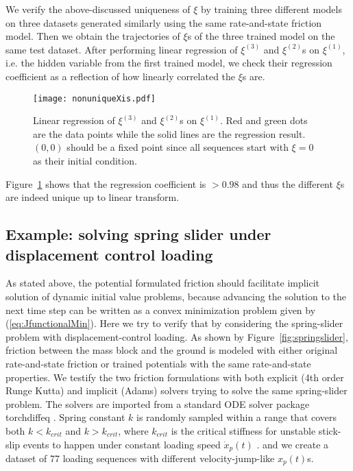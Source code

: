 We verify the above-discussed uniqueness of $\xi$ by training three different models on three datasets generated similarly using the same rate-and-state friction model. 
Then we obtain the trajectories of $\xi$s of the three trained model on the same test dataset. 
After performing linear regression of $\xi^{(3)}$ and $\xi^{(2)}$s on $\xi^{(1)}$, 
i.e. the hidden variable from the first trained model, 
we check their regression coefficient as a reflection of how linearly correlated the $\xi$s are. 

\begin{figure}[htb!]
    \centering
    \texttt{[image: nonuniqueXis.pdf]}
    \caption{Linear regression of $\xi^{(3)}$ and $\xi^{(2)}$s on $\xi^{(1)}$. 
    Red and green dots are the data points while the solid lines are the regression result.
    $(0, 0)$ should be a fixed point since all sequences start with $\xi = 0$ as their initial condition.}
    \label{fig:nonuniqueXis}
\end{figure}

Figure~\ref{fig:nonuniqueXis} shows that the regression coefficient is $>0.98$ and thus the different $\xi$s are indeed unique up to linear transform.


\subsection{Example: solving spring slider under displacement control loading}
As stated above, 
the potential formulated friction should facilitate implicit solution of dynamic initial value problems, 
because advancing the solution to the next time step can be written as a convex minimization problem given by (\ref{eq:JfunctionalMin}). 
Here we try to verify that by considering the spring-slider problem with displacement-control loading. 
As shown by Figure~\ref{fig:springslider}, 
friction between the mass block and the ground is modeled with either original rate-and-state friction or trained potentials with the same rate-and-state properties. 
We testify the two friction formulations with both explicit (4th order Runge Kutta) and implicit (Adams) solvers trying to solve the same spring-slider problem. 
The solvers are imported from a standard ODE solver package torchdiffeq \citep{torchdiffeq}.
Spring constant $k$ is randomly sampled within a range that covers both $k < k_{crit}$ and $k > k_{crit}$, 
where $k_{crit}$ is the critical stiffness for unstable stick-slip events to happen under constant loading speed $\dot{x}_p(t)$ \citep{rice_stability_1983, Gu_Rice_1984}. 
and we create a dataset of 77 loading sequences with different velocity-jump-like $x_p(t)$s. 

